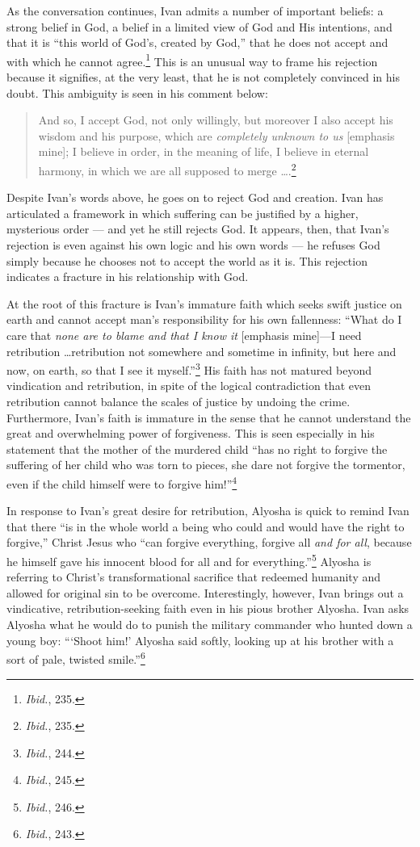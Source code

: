 As the conversation continues, Ivan admits a number of important beliefs: a strong belief in God, a belief in a limited view of God and His intentions, and that it is ``this world of God's, created by God,'' that he does not accept and with which he cannot agree.\footnote{\emph{Ibid.}, 235.} This is an unusual way to frame his rejection because it signifies, at the very least, that he is not completely convinced in his doubt. This ambiguity is seen in his comment below:

\begin{quote}
\singlespacing
And so, I accept God, not only willingly, but moreover I also accept his wisdom and his purpose, which are \emph{completely unknown to us} [emphasis mine]; I believe in order, in the meaning of life, I believe in eternal harmony, in which we are all supposed to merge \ldots.\footnote{\emph{Ibid.}, 235.}
\end{quote} 

Despite Ivan's words above, he goes on to reject God and creation. Ivan has articulated a framework in which suffering can be justified by a higher, mysterious order --- and yet he still rejects God. It appears, then, that Ivan's rejection is even against his own logic and his own words --- he refuses God simply because he chooses not to accept the world as it is. This rejection indicates a fracture in his relationship with God.

At the root of this fracture is Ivan's immature faith which seeks swift justice on earth and cannot accept man's responsibility for his own fallenness: ``What do I care that \emph{none are to blame and that I know it} [emphasis mine]---I need retribution \ldots retribution not somewhere and sometime in infinity, but here and now, on earth, so that I see it myself.''\footnote{\emph{Ibid.}, 244.} His faith has not matured beyond vindication and retribution, in spite of the logical contradiction that even retribution cannot balance the scales of justice by undoing the crime. Furthermore, Ivan's faith is immature in the sense that he cannot understand the great and overwhelming power of forgiveness. This is seen especially in his statement that the mother of the murdered child ``has no right to forgive the suffering of her child who was torn to pieces, she dare not forgive the tormentor, even if the child himself were to forgive him!\thinspace''\footnote{\emph{Ibid.}, 245.}

In response to Ivan's great desire for retribution, Alyosha is quick to remind Ivan that there ``is in the whole world a being who could and would have the right to forgive,'' Christ Jesus who ``can forgive everything, forgive all \emph{and for all}, because he himself gave his innocent blood for all and for everything.''\footnote{\emph{Ibid.}, 246.} Alyosha is referring to Christ's transformational sacrifice that redeemed humanity and allowed for original sin to be overcome. Interestingly, however, Ivan brings out a vindicative, retribution-seeking faith even in his pious brother Alyosha. Ivan asks Alyosha what he would do to punish the military commander who hunted down a young boy: ``\thinspace`Shoot him!\thinspace' Alyosha said softly, looking up at his brother with a sort of pale, twisted smile.''\footnote{\emph{Ibid.}, 243.} 

